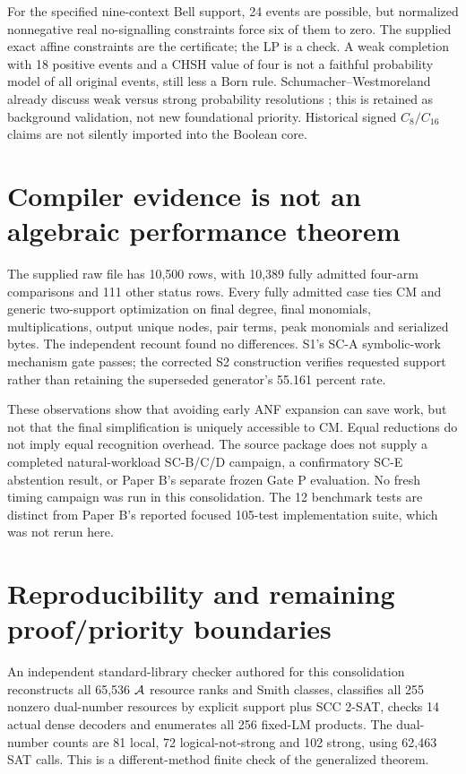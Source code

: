 \documentclass[11pt]{article}
\theoremstyle{remark}
\begin{document}
For the specified nine-context Bell support, 24 events are possible, but
normalized nonnegative real no-signalling constraints force six of them to
zero. The supplied exact affine constraints are the certificate; the LP is a
check. A weak completion with 18 positive events and a CHSH value of four is
not a faithful probability model of all original events, still less a Born
rule. Schumacher--Westmoreland already discuss weak versus strong probability
resolutions \cite{Schumacher2012}; this is retained as background validation,
not new foundational priority. Historical signed $C_8/C_{16}$ claims are not
silently imported into the Boolean core.

\section{Compiler evidence is not an algebraic performance theorem}
\label{sec:compiler}
The supplied raw file has 10,500 rows, with 10,389 fully admitted four-arm
comparisons and 111 other status rows. Every fully admitted case ties CM and
generic two-support optimization on final degree, final monomials,
multiplications, output unique nodes, pair terms, peak monomials and serialized
bytes. The independent recount found no differences. S1's SC-A symbolic-work
mechanism gate passes; the corrected S2 construction verifies requested support
rather than retaining the superseded generator's 55.161 percent rate.

These observations show that avoiding early ANF expansion can save work, but
not that the final simplification is uniquely accessible to CM. Equal reductions
do not imply equal recognition overhead. The source package does not supply a
completed natural-workload SC-B/C/D campaign, a confirmatory SC-E abstention
result, or Paper B's separate frozen Gate P evaluation. No fresh timing campaign
was run in this consolidation. The 12 benchmark tests are distinct from Paper
B's reported focused 105-test implementation suite, which was not rerun here.

\section{Reproducibility and remaining proof/priority boundaries}
An independent standard-library checker authored for this consolidation
reconstructs all 65,536 $\mathcal A$ resource ranks and Smith classes, classifies all
255 nonzero dual-number resources by explicit support plus SCC 2-SAT, checks
14 actual dense decoders and enumerates all 256 fixed-LM products. The dual-number
counts are 81 local, 72 logical-not-strong and 102 strong, using 62,463 SAT calls.
This is a different-method finite check of the generalized theorem.
\end{document}
